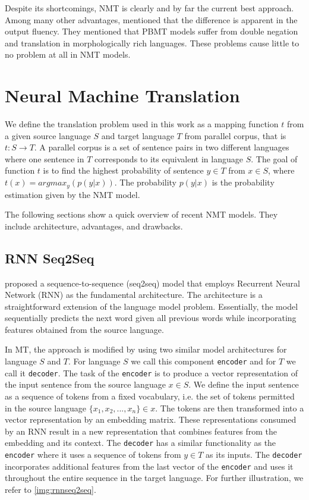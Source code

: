 Despite its shortcomings, NMT is clearly and by far the current best approach. Among many other advantages,  mentioned that the difference is apparent in the output fluency. They mentioned that PBMT models suffer from double negation and translation in morphologically rich languages. These problems cause little to no problem at all in NMT models.

\section{Neural Machine Translation}
\label{sec:bm_nmt}
We define the translation problem used in this work as a mapping function $t$ from a given source language $S$ and target language $T$ from parallel corpus, that is $t : S \rightarrow T$. A parallel corpus is a set of sentence pairs in two different languages where one sentence in $T$ corresponds to its equivalent in language $S$. The goal of function $t$ is to find the highest probability of sentence $y \in T$ from $x \in S$, where $t(x) = argmax_y(p(y|x))$. The probability $p(y|x)$ is the probability estimation given by the NMT model.

The following sections show a quick overview of recent NMT models. They include architecture, advantages, and drawbacks.

\subsection{RNN Seq2Seq}
 proposed a sequence-to-sequence (seq2seq) model that employs Recurrent Neural Network (RNN) as the fundamental architecture. The architecture is a straightforward extension of the language model problem. Essentially, the model sequentially predicts the next word given all previous words while incorporating features obtained from the source language.

In MT, the approach is modified by using two similar model architectures for language $S$ and $T$. For language $S$ we call this component \texttt{encoder} and for $T$ we call it \texttt{decoder}.
The task of the \texttt{encoder} is to produce a vector representation of the input sentence from the source language $x \in S$. We define the input sentence as a sequence of tokens from a fixed vocabulary, i.e. the set of tokens permitted in the source language $\{x_1, x_2, ..., x_n\} \in x$. The tokens are then transformed into a vector representation by an embedding matrix. These representations consumed by an RNN result in a new representation that combines features from the embedding and its context. The \texttt{decoder} has a similar functionality as the \texttt{encoder} where it uses a sequence of tokens from $y \in T$ as its inputs. The \texttt{decoder} incorporates additional features from the last vector of the \texttt{encoder} and uses it throughout the entire sequence in the target language. For further illustration, we refer to \cref{img:rnnseq2seq}.

